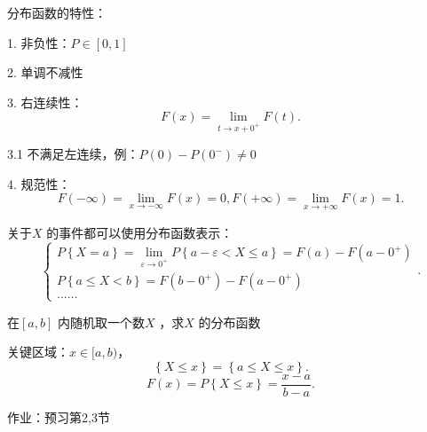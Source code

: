 \begin{notation}
    分布函数的特性：

    1. 非负性：$P\in \left[ 0,1 \right] $

    2. 单调不减性

    3. 右连续性：\[
        F\left( x \right) =\lim_{t \to x+0^+} F\left( t \right) 
    .\] 

    3.1 不满足左连续，例：$P\left( 0 \right) -P\left( 0^- \right) \neq 0$

    4. 规范性：\[
        F\left( -\infty \right) =\lim_{x \to -\infty} F\left( x \right) =0,F\left( +\infty \right) =\lim_{x \to +\infty} F\left( x \right) =1
    .\] 
\end{notation}
关于$X$ 的事件都可以使用分布函数表示：
\[
    \begin{cases}
        P\left\{ X=a \right\} =\displaystyle{\lim_{\varepsilon \to 0^+}} P\left\{ a-\varepsilon<X\le a \right\} =F\left( a \right) -F\left( a-0^+ \right) \\
        P\left\{ a\le X<b \right\} =F\left( b-0^+ \right) -F\left( a-0^+ \right) \\
        \ldots\ldots
    \end{cases}
.\] 
\begin{eg}
    在$\left[ a,b \right] $ 内随机取一个数$X$ ，求$X$ 的分布函数

    关键区域：$x\in [a,b)$，\[
        \left\{ X\le x \right\} =\left\{ a\le X\le x \right\} 
    .\] 
    \[
        F\left( x \right) =P\left\{ X\le x \right\} =\frac{x-a}{b-a}
    .\] 
\end{eg}
作业：预习第2,3节
